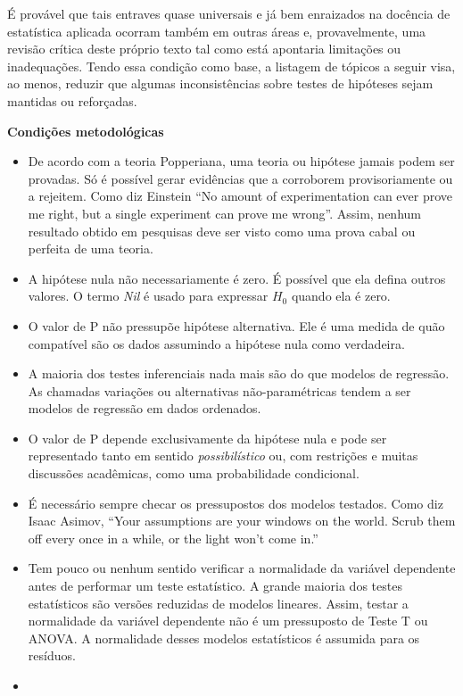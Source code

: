 \documentclass[
]{book}
\begin{document}
É provável que tais entraves quase universais e já bem enraizados na docência de estatística aplicada ocorram também em outras áreas e, provavelmente, uma revisão crítica deste próprio texto tal como está apontaria limitações ou inadequações. Tendo essa condição como base, a listagem de tópicos a seguir visa, ao menos, reduzir que algumas inconsistências sobre testes de hipóteses sejam mantidas ou reforçadas.

\textbf{Condições metodológicas}

\begin{itemize}
\item
  De acordo com a teoria Popperiana, uma teoria ou hipótese jamais podem ser provadas. Só é possível gerar evidências que a corroborem provisoriamente ou a rejeitem. Como diz Einstein ``No amount of experimentation can ever prove me right, but a single experiment can prove me wrong''. Assim, nenhum resultado obtido em pesquisas deve ser visto como uma prova cabal ou perfeita de uma teoria.
\item
  A hipótese nula não necessariamente é zero. É possível que ela defina outros valores. O termo \emph{Nil} é usado para expressar \(H_0\) quando ela é zero.
\item
  O valor de P não pressupõe hipótese alternativa. Ele é uma medida de quão compatível são os dados assumindo a hipótese nula como verdadeira.
\item
  A maioria dos testes inferenciais nada mais são do que modelos de regressão. As chamadas variações ou alternativas não-paramétricas tendem a ser modelos de regressão em dados ordenados.
\item
  O valor de P depende exclusivamente da hipótese nula e pode ser representado tanto em sentido \emph{possibilístico} ou, com restrições e muitas discussões acadêmicas, como uma probabilidade condicional.
\item
  É necessário sempre checar os pressupostos dos modelos testados. Como diz Isaac Asimov, ``Your assumptions are your windows on the world. Scrub them off every once in a while, or the light won't come in.''
\item
  Tem pouco ou nenhum sentido verificar a normalidade da variável dependente antes de performar um teste estatístico. A grande maioria dos testes estatísticos são versões reduzidas de modelos lineares. Assim, testar a normalidade da variável dependente não é um pressuposto de Teste T ou ANOVA. A normalidade desses modelos estatísticos é assumida para os resíduos.
\item

\end{itemize}
\end{document}
